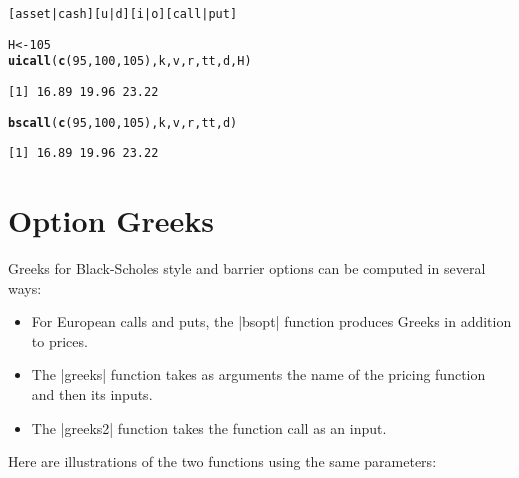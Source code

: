 \documentclass{article}\usepackage[]{graphicx}\usepackage[]{color}
\makeatletter
\newcommand{\hlnum}[1]{\textcolor[rgb]{0.686,0.059,0.569}{#1}}%
\newcommand{\hlstd}[1]{\textcolor[rgb]{0.345,0.345,0.345}{#1}}%
\newcommand{\hlkwb}[1]{\textcolor[rgb]{0.69,0.353,0.396}{#1}}%
\newcommand{\hlkwd}[1]{\textcolor[rgb]{0.737,0.353,0.396}{\textbf{#1}}}%
\newenvironment{kframe}{%
 \def\at@end@of@kframe{}%
 \ifinner\ifhmode%
  \def\at@end@of@kframe{\end{minipage}}%
  \begin{minipage}{\columnwidth}%
 \fi\fi%
 \def\FrameCommand##1{\hskip\@totalleftmargin \hskip-\fboxsep
 \colorbox{shadecolor}{##1}\hskip-\fboxsep
     \hskip-\linewidth \hskip-\@totalleftmargin \hskip\columnwidth}%
 \MakeFramed {\advance\hsize-\width
   \@totalleftmargin\z@ \linewidth\hsize
   \@setminipage}}%
 {\par\unskip\endMakeFramed%
 \at@end@of@kframe}
\newenvironment{knitrout}{}{} %
\makeatother
\begin{document}
\begin{verbatim}
[asset|cash][u|d][i|o][call|put]
\end{verbatim}


\begin{knitrout}\footnotesize
{}\color{fgcolor}\begin{kframe}
\begin{alltt}
\hlstd{H} \hlkwb{<-} \hlnum{105}
\hlkwd{uicall}\hlstd{(}\hlkwd{c}\hlstd{(}\hlnum{95}\hlstd{,} \hlnum{100}\hlstd{,} \hlnum{105}\hlstd{), k, v, r, tt, d, H)}
\end{alltt}
\begin{verbatim}
[1] 16.89 19.96 23.22
\end{verbatim}
\begin{alltt}
\hlkwd{bscall}\hlstd{(}\hlkwd{c}\hlstd{(}\hlnum{95}\hlstd{,} \hlnum{100}\hlstd{,} \hlnum{105}\hlstd{), k, v, r, tt, d)}
\end{alltt}
\begin{verbatim}
[1] 16.89 19.96 23.22
\end{verbatim}
\end{kframe}
\end{knitrout}

\section{Option Greeks}

Greeks for Black-Scholes style and barrier options can be computed in
several ways:
\begin{itemize}
\item For European calls and puts, the |bsopt| function produces
  Greeks in addition to prices. 
\item The |greeks| function takes as arguments the name of the pricing
  function and then its inputs.
\item The |greeks2| function takes the function call as an input.
\end{itemize}
Here are illustrations of the two functions using the same parameters:
\end{document}
